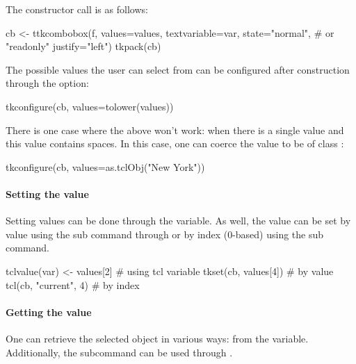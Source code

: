 The constructor call is as follows:
\begin{Schunk}
\begin{Sinput}
 cb <- ttkcombobox(f,
                   values=values,
                   textvariable=var,
                   state="normal", # or "readonly"
                   justify="left")
 tkpack(cb)
\end{Sinput}
\end{Schunk}


The possible values the user can select from can be configured after
construction through the  option:
\begin{Schunk}
\begin{Sinput}
 tkconfigure(cb, values=tolower(values))
\end{Sinput}
\end{Schunk}

There is one case where the above won't work: when there is a single
value and this value contains spaces. In this case, one can coerce the
value to be of class :
\begin{Schunk}
\begin{Sinput}
 tkconfigure(cb, values=as.tclObj("New York"))
\end{Sinput}
\end{Schunk}

\paragraph{Setting the value}
Setting values can be done through the \TCL\/ variable. As well, the
value can be set by value using the  sub
command through  or by index (0-based) using the
 sub command.

\begin{Schunk}
\begin{Sinput}
 tclvalue(var) <- values[2]            # using tcl variable
 tkset(cb, values[4])                  # by value
 tcl(cb, "current", 4)                 # by index
\end{Sinput}
\end{Schunk}


\paragraph{Getting the value}
One can retrieve the selected object in various ways: from the \TCL\/
variable. Additionally, the  subcommand
can be used through .

